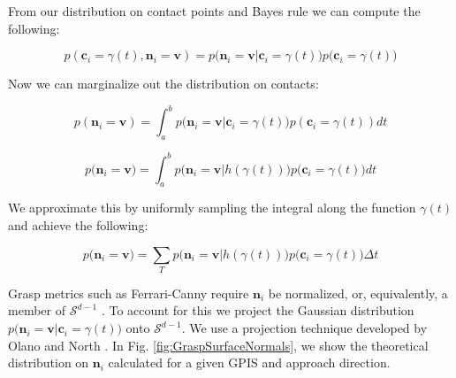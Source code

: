 \documentclass[letterpaper, 10 pt, conference]{ieeeconf}  %
\begin{document}
From our distribution on contact points and Bayes rule we can compute the following: 

\begin{equation}
p(\textbf{c}_i = \gamma(t), \textbf{n}_i = \textbf{v}) = p\big(\textbf{n}_i = \textbf{v} | \textbf{c}_i = \gamma(t) \big)p\big(\textbf{c}_i = \gamma(t)\big)
\end{equation}

Now we can marginalize out the distribution on contacts:

\begin{equation}
p(\textbf{n}_i = \textbf{v}) = \int_a^b  p \big(\textbf{n}_i = \textbf{v} | \textbf{c}_i = \gamma(t) \big)p(\textbf{c}_i = \gamma(t)) dt
\end{equation}

\begin{equation}
p\big(\textbf{n}_i = \textbf{v}\big) = \int_a^b  p \big(\textbf{n}_i = \textbf{v} | h(\gamma(t))\big)p\big(\textbf{c}_i = \gamma(t)\big) dt
\end{equation}

We approximate this by uniformly sampling the integral along the function $\gamma(t)$ and achieve the following: 

\begin{equation}
p\big( \textbf{n}_i = \textbf{v} \big) = \sum_T  p \big( \textbf{n}_i = \textbf{v} | h(\gamma(t)) \big) p\big(\textbf{c}_i = \gamma(t)\big) \Delta t
\end{equation}


Grasp metrics such as  Ferrari-Canny require $\textbf{n}_i$ be normalized, or, equivalently, a member of $\mathcal{S}^{d-1}$ \cite{ferrari1992}. To account for this we project the Gaussian distribution $p \big(\textbf{n}_i = \textbf{v} |\textbf{c}_i = \gamma(t) \big)$  onto $\mathcal{S}^{d-1}$. We use a projection technique developed by Olano and North \cite{olano1997normal}. In Fig.
\ref{fig:GraspSurfaceNormals}, we show the theoretical distribution on $\textbf{n}_i$ calculated for a given GPIS and approach direction.
\end{document}
